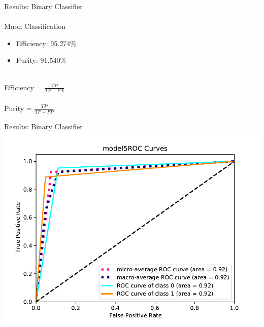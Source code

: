 \documentclass[10pt,handout]{beamer}
\begin{document}
\begin{frame}{Results: Binary Classifier}
\quad \\ \quad \\
Muon Classification \\
\begin{itemize}
\item Efficiency: 95.274\%
\item Purity: 91.540\%
\end{itemize}
\quad \quad \\
Efficiency = $\frac{TP}{TP+FN}$ \\
\quad \\
Purity = $\frac{TP}{TP+FP}$
\end{frame}

\begin{frame}{Results: Binary Classifier}
\centering
\includegraphics[scale=0.6]{model5_ROCcurves.pdf}
\end{frame}
\end{document}
